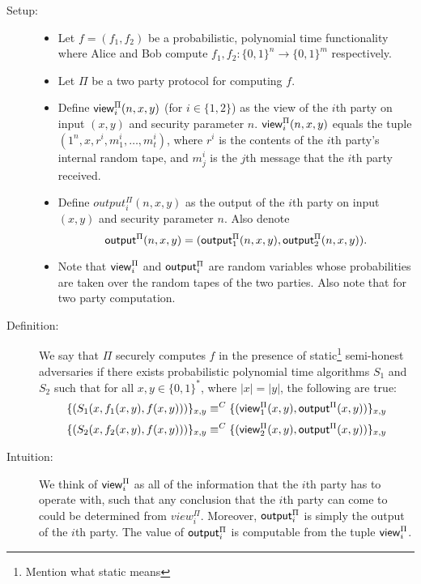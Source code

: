 \begin{description}
\item [Setup:] \hfill
    \begin{itemize}
        \item Let $f = (f_1, f_2)$ be a probabilistic, polynomial time functionality where Alice and Bob compute $f_1, f_2: \{0,1\}^n \to \{0,1\}^m$ respectively.

        \item Let $\Pi$ be a two party protocol for computing $f$. 

        \item Define ${\sf view}_i^{\Pi}(n,x,y)$ (for $i \in \{1,2\}$) as the view of the $i$th party on input $(x,y)$ and security parameter $n$.
        ${\sf view}_i^{\Pi}(n,x,y)$ equals the tuple $(1^n, x, r^i, m_1^i, \ldots, m_t^i)$, where $r^i$ is the contents of the $i$th party's internal random tape, and $m_j^i$ is the $j$th message that the $i$th party received.
    
        \item Define $output^{\Pi}_i(n,x,y)$ as the output of the $i$th party on input $(x,y)$ and security parameter $n$.
        Also denote
        $$ {\sf output}^{\Pi}(n,x,y) = ({\sf output}^{\Pi}_1(n,x,y), {\sf output}^{\Pi}_2(n,x,y)).$$

    \item Note that ${\sf view}^{\Pi}_i$ and ${\sf output}^{\Pi}_i$ are random variables whose probabilities are taken over the random tapes of the two parties. Also note that for two party computation.
\end{itemize}
\item [Definition:]
    We say that $\Pi$ securely computes $f$ in the presence of static\footnote{ Mention what static means} semi-honest adversaries if there exists probabilistic polynomial time algorithms $S_1$ and $S_2$ such that for all $x,y \in \{0,1\}^*$, where $|x| = |y|$, the following are true:
\begin{equation} 
    \label{eqn:secdef1}
    \{(S_1(x, f_1(x,y), f(x,y)))\}_{x,y} \equiv^C \{({\sf view}^{\Pi}_1(x,y), {\sf output}^{\Pi}(x,y)) \}_{x,y} 
\end{equation}
\begin{equation} 
    \label{eqn:secdef2}
    \{(S_2(x, f_2(x,y), f(x,y)))\}_{x,y} \equiv^C \{({\sf view}^{\Pi}_2(x,y), {\sf output}^{\Pi}(x,y)) \}_{x,y} 
\end{equation}

\item[Intuition:]
We think of ${\sf view}^{\Pi}_i$ as all of the information that the $i$th party has to operate with, such that any conclusion that the $i$th party can come to could be determined from $view^{\Pi}_i$.
Moreover, ${\sf output}^{\Pi}_i$ is simply the output of the $i$th party. 
The value of ${\sf output}^{\Pi}_i$ is computable from the tuple ${\sf view}^{\Pi}_i$.


\end{description}
